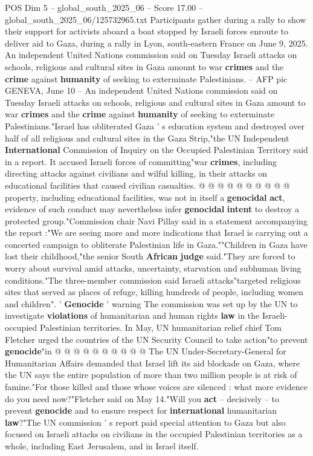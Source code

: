 \begin{textsample}{POS Dim 5 – global\_south\_2025\_06 – Score 17.00 – global\_south\_2025\_06/125732965.txt}  \label{ex:f5_pos_044}
Participants gather during a rally to show their support for activists aboard a boat stopped by Israeli forces enroute to deliver aid to Gaza, during a rally in Lyon, south-eastern France on June 9, 2025.
An independent United Nations commission said on Tuesday Israeli attacks on schools, religious and cultural sites in Gaza amount to war \textbf{crimes} and the \textbf{crime} against \textbf{humanity} of seeking to exterminate Palestinians. -- AFP pic GENEVA, June 10 -- An independent United Nations commission said on Tuesday Israeli attacks on schools, religious and cultural sites in Gaza amount to war \textbf{crimes} and the \textbf{crime} against \textbf{humanity} of seeking to exterminate Palestinians."Israel has obliterated Gaza ' s education system and destroyed over half of all religious and cultural sites in the Gaza Strip,"the UN Independent \textbf{International} Commission of Inquiry on the Occupied Palestinian Territory said in a report.
It accused Israeli forces of committing"war \textbf{crimes}, including directing attacks against civilians and wilful killing, in their attacks on educational facilities that caused civilian casualties. @ @ @ @ @ @ @ @ @ @ property, including educational facilities, was not in itself a \textbf{genocidal} \textbf{act}, evidence of such conduct may nevertheless infer \textbf{genocidal} \textbf{intent} to destroy a protected group."Commission chair Navi Pillay said in a statement accompanying the report :"We are seeing more and more indications that Israel is carrying out a concerted campaign to obliterate Palestinian life in Gaza.""Children in Gaza have lost their childhood,"the senior South \textbf{African} \textbf{judge} said."They are forced to worry about survival amid attacks, uncertainty, starvation and subhuman living conditions."The three-member commission said Israeli attacks"targeted religious sites that served as places of refuge, killing hundreds of people, including women and children". ' \textbf{Genocide} ' warning The commission was set up by the UN to investigate \textbf{violations} of humanitarian and human rights \textbf{law} in the Israeli-occupied Palestinian territories.
In May, UN humanitarian relief chief Tom Fletcher urged the countries of the UN Security Council to take action"to prevent \textbf{genocide}"in @ @ @ @ @ @ @ @ @ @ The UN Under-Secretary-General for Humanitarian Affairs demanded that Israel lift its aid blockade on Gaza, where the UN says the entire population of more than two million people is at risk of famine."For those killed and those whose voices are silenced : what more evidence do you need now?"Fletcher said on May 14."Will you \textbf{act} -- decisively -- to prevent \textbf{genocide} and to ensure respect for \textbf{international} humanitarian \textbf{law}?"The UN commission ' s report paid special attention to Gaza but also focused on Israeli attacks on civilians in the occupied Palestinian territories as a whole, including East Jerusalem, and in Israel itself.

\end{textsample}
